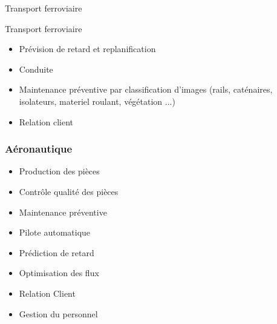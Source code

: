 \begin{frame}{Transport ferroviaire}
\end{frame}

\begin{frame}{Transport ferroviaire}
  \begin{itemize}
  \item Prévision de retard et replanification
  \item Conduite
  \item Maintenance préventive par classification d'images (rails, caténaires, isolateurs, materiel roulant, végétation ...)
  \item Relation client
  \end{itemize}
\end{frame}

\begin{frame}
  \frametitle{Aéronautique}
  \begin{minipage}[c]{0.49\linewidth}
    \begin{itemize}
    \item Production des pièces
    \item Contrôle qualité des pièces
    \item Maintenance préventive
    \item Pilote automatique
    \item Prédiction de retard
    \item Optimisation des flux
    \item Relation Client
    \item Gestion du personnel
    \end{itemize}
  \end{minipage}\hfill
  \begin{minipage}[c]{0.49\linewidth}
  \end{minipage}\hfill
\end{frame}

